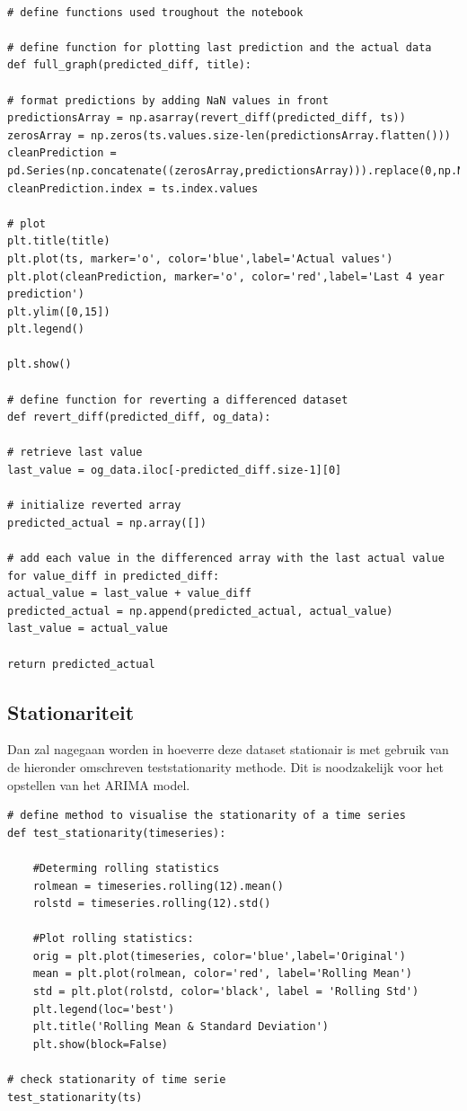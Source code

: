 \begin{verbatim}

# define functions used troughout the notebook

# define function for plotting last prediction and the actual data
def full_graph(predicted_diff, title):

# format predictions by adding NaN values in front
predictionsArray = np.asarray(revert_diff(predicted_diff, ts))
zerosArray = np.zeros(ts.values.size-len(predictionsArray.flatten()))
cleanPrediction = pd.Series(np.concatenate((zerosArray,predictionsArray))).replace(0,np.NaN)
cleanPrediction.index = ts.index.values

# plot
plt.title(title)
plt.plot(ts, marker='o', color='blue',label='Actual values')
plt.plot(cleanPrediction, marker='o', color='red',label='Last 4 year prediction')
plt.ylim([0,15])
plt.legend()

plt.show()

# define function for reverting a differenced dataset
def revert_diff(predicted_diff, og_data):

# retrieve last value
last_value = og_data.iloc[-predicted_diff.size-1][0]

# initialize reverted array
predicted_actual = np.array([])

# add each value in the differenced array with the last actual value
for value_diff in predicted_diff:
actual_value = last_value + value_diff
predicted_actual = np.append(predicted_actual, actual_value)
last_value = actual_value

return predicted_actual
\end{verbatim}

\subsection{Stationariteit}

Dan zal nagegaan worden in hoeverre deze dataset stationair is met gebruik van de hieronder omschreven test\textunderscore stationarity methode. Dit is noodzakelijk voor het opstellen van het ARIMA model.

\begin{verbatim}
# define method to visualise the stationarity of a time series
def test_stationarity(timeseries):

    #Determing rolling statistics
    rolmean = timeseries.rolling(12).mean()
    rolstd = timeseries.rolling(12).std()
    
    #Plot rolling statistics:
    orig = plt.plot(timeseries, color='blue',label='Original')
    mean = plt.plot(rolmean, color='red', label='Rolling Mean')
    std = plt.plot(rolstd, color='black', label = 'Rolling Std')
    plt.legend(loc='best')
    plt.title('Rolling Mean & Standard Deviation')
    plt.show(block=False)

# check stationarity of time serie
test_stationarity(ts)
\end{verbatim}

